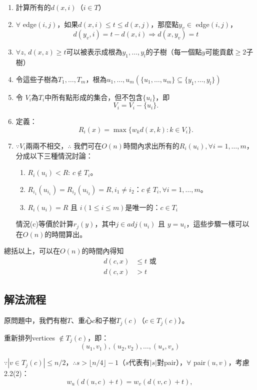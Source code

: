 \documentclass[15pt]{extarticle}
\begin{document}
\begin{enumerate}
    \item 計算所有的$d(x,i)$（$i\in T$）
    \item $\forall$ edge$(i,j)$，如果$d(x,i)\le t\le d(x,j)$，那麼點$y_v\in$ edge$(i,j)$，$$d(y_v, i) = t-d(x,i)\Rightarrow d(x,y_v)=t$$ 
    \item $\forall z$, $d(x,z)\ge t$可以被表示成根為$y_1,\dots,y_l$的子樹（每一個點$y$可能貢獻$\ge2$子樹）
    \item 令這些子樹為$T_1,\dots,T_m$，根為$u_1,\dots,u_m(\{u_1,\dots,u_m\}\subseteq\{y_1,\dots,y_l\})$
    \item 令 $V_i$為$T_i$中所有點形成的集合，但不包含$\{u_i\}$，即$$V_i=V_i-\{u_i\}.$$
    \item 定義：$$R_i(x)=\max\{w_kd(x,k):k\in V_i\}.$$
    \item $\because V_i$兩兩不相交，$\therefore$ 我們可在$O(n)$時間內求出所有的$R_i(u_i), \forall i = 1,\dots,m$，分成以下三種情況討論：
    \begin{enumerate}
        \item $R_i(u_i) < R$: $c\notin T_i$。
        \item $R_{i_1}(u_{i_1})=R_{i_2}(u_{i_2})=R, i_1 \ne i_2$：$c\notin T_i,\forall i=1,\dots,m$。
        \item $R_i(u_i)=R$ 且 $i(1\le i\le m)$是唯一的：$c\in T_i$
    \end{enumerate}
    情況(c)等價於計算$r_j(y)$，其中$j\in adj(u_i)$ 且 $y=u_i$，這些步驟一樣可以在$O(n)$的時間算出。
\end{enumerate}

總括以上，可以在$O(n)$的時間內得知 
\begin{align*}
d(c,x) &\le t  \mbox{ 或}\\
d(c,x) &>   t 
\end{align*}

\subsection{解法流程}
原問題中，我們有樹$T$、重心$c$和子樹$T_j(c)$（$c\in T_j(c)$）。

重新排列vertices $\notin T_j(c)$，即：$$(u_1,v_1),(u_2,v_2),\dots,(u_s,v_s)$$

$\because |v\in T_j(c)|\le n/2$，$\therefore s>\lfloor n/4\rfloor-1$（$s$代表有$|s|$對pair），$\forall$ pair$(u,v)$，考慮2.2(2)：
\begin{equation*}
    w_u(d(u,c)+t)=w_v(d(v,c)+t), \tag{2}
\end{equation*}
\end{document}

